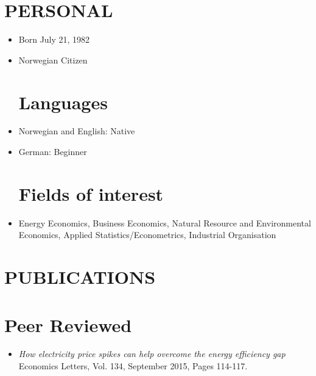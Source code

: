 \documentclass[margin]{res}
\begin{document}
  

\address{Institutt for industriell \o konomi og teknologiledelse\\ NTNU\\
7491 Trondheim \\ mob:  +47 90 56 64 62 \\ email: johannes.mauritzen@nhh.no \\
website:  \url{jmaurit.github.io} }
                           
                        
\begin{resume} 
\section{PERSONAL}
\begin{itemize} 
\item[] Born July 21, 1982
\item[] Norwegian Citizen

\normalsize{\section{Languages}}
\item[] Norwegian and English: Native
\item[] German: Beginner 

\normalsize{\section{Fields of interest}}
\item[] Energy Economics, Business Economics, Natural Resource and Environmental Economics, Applied Statistics/Econometrics, Industrial Organisation
\end{itemize}  


\section{PUBLICATIONS}       

\normalsize{\section{Peer Reviewed}}
\begin{itemize}
\setlength{\itemsep}{10pt}
\item[] \emph{How electricity price spikes can help overcome the energy efficiency gap}\\
Economics Letters, Vol. 134, September 2015, Pages 114-117.


\end{itemize}
\end{resume}
\end{document}
